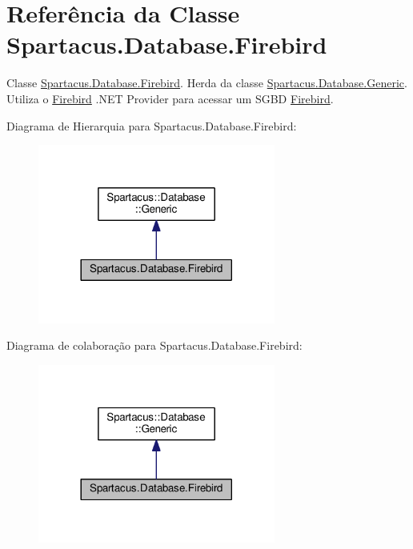 \hypertarget{classSpartacus_1_1Database_1_1Firebird}{\section{Referência da Classe Spartacus.\+Database.\+Firebird}
\label{classSpartacus_1_1Database_1_1Firebird}
}


Classe \hyperlink{classSpartacus_1_1Database_1_1Firebird}{Spartacus.\+Database.\+Firebird}. Herda da classe \hyperlink{classSpartacus_1_1Database_1_1Generic}{Spartacus.\+Database.\+Generic}. Utiliza o \hyperlink{classSpartacus_1_1Database_1_1Firebird}{Firebird} .N\+E\+T Provider para acessar um S\+G\+B\+D \hyperlink{classSpartacus_1_1Database_1_1Firebird}{Firebird}.  




Diagrama de Hierarquia para Spartacus.\+Database.\+Firebird\+:
\nopagebreak
\begin{figure}[H]
\begin{center}
\leavevmode
\includegraphics[width=221pt]{classSpartacus_1_1Database_1_1Firebird__inherit__graph}
\end{center}
\end{figure}


Diagrama de colaboração para Spartacus.\+Database.\+Firebird\+:
\nopagebreak
\begin{figure}[H]
\begin{center}
\leavevmode
\includegraphics[width=221pt]{classSpartacus_1_1Database_1_1Firebird__coll__graph}
\end{center}
\end{figure}
